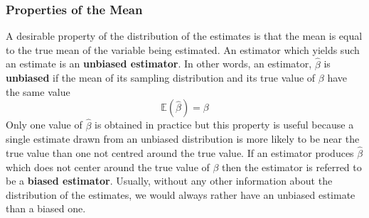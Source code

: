 \documentclass[11pt]{article}
\begin{document}
\subsubsection{Properties of the Mean}
A desirable property of the distribution of the estimates is that the mean is equal to the true mean of the variable being estimated. An estimator which yields such an estimate is an \textbf{unbiased estimator}. In other words, an estimator, $\hat{\beta}$ is \textbf{unbiased} if the mean of its sampling distribution and its true value of $\beta$ have the same value
\begin{equation}
\mathbb{E}(\hat{\beta}) = \beta \label{eg4_9}
\end{equation}
Only one value of $\hat{\beta}$ is obtained in practice but this property is useful because a single estimate drawn from an unbiased distribution is more likely to be near the true value than one not centred around the true value. If an estimator produces $\hat{\beta}$ which does not center around the true value of $\beta$ then the estimator is referred to be a \textbf{biased estimator}. Usually, without any other information about the distribution of the estimates, we would always rather have an unbiased estimate than a biased one.
\end{document}
